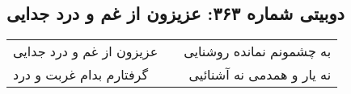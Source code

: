 \begin{center}
\section*{دوبیتی شماره ۳۶۳: عزیزون از غم و درد جدایی}
\label{sec:363}
\begin{longtable}{l p{0.5cm} r}
عزیزون از غم و درد جدایی
&&
به چشمونم نمانده روشنایی
\\
گرفتارم بدام غربت و درد
&&
نه یار و همدمی نه آشنائیی
\\
\end{longtable}
\end{center}
